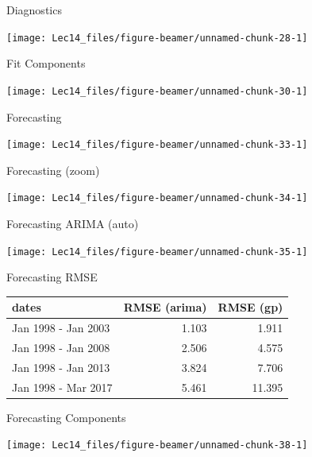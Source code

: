 \documentclass[11pt,ignorenonframetext,]{beamer}
\begin{document}
\begin{frame}{Diagnostics}
\protect\hypertarget{diagnostics}{}

\begin{center}\texttt{[image: Lec14\_files/figure-beamer/unnamed-chunk-28-1]} \end{center}

\end{frame}

\begin{frame}{Fit Components}
\protect\hypertarget{fit-components}{}

\begin{center}\texttt{[image: Lec14\_files/figure-beamer/unnamed-chunk-30-1]} \end{center}

\end{frame}

\begin{frame}{Forecasting}
\protect\hypertarget{forecasting}{}

\begin{center}\texttt{[image: Lec14\_files/figure-beamer/unnamed-chunk-33-1]} \end{center}

\end{frame}

\begin{frame}{Forecasting (zoom)}
\protect\hypertarget{forecasting-zoom}{}

\begin{center}\texttt{[image: Lec14\_files/figure-beamer/unnamed-chunk-34-1]} \end{center}

\end{frame}

\begin{frame}{Forecasting ARIMA (auto)}
\protect\hypertarget{forecasting-arima-auto}{}

\begin{center}\texttt{[image: Lec14\_files/figure-beamer/unnamed-chunk-35-1]} \end{center}

\end{frame}

\begin{frame}{Forecasting RMSE}
\protect\hypertarget{forecasting-rmse}{}

\begin{longtable}[]{@{}lrr@{}}
\toprule
dates & RMSE (arima) & RMSE (gp)\tabularnewline
\midrule
\endhead
Jan 1998 - Jan 2003 & 1.103 & 1.911\tabularnewline
Jan 1998 - Jan 2008 & 2.506 & 4.575\tabularnewline
Jan 1998 - Jan 2013 & 3.824 & 7.706\tabularnewline
Jan 1998 - Mar 2017 & 5.461 & 11.395\tabularnewline
\bottomrule
\end{longtable}

\end{frame}

\begin{frame}{Forecasting Components}
\protect\hypertarget{forecasting-components}{}

\begin{center}\texttt{[image: Lec14\_files/figure-beamer/unnamed-chunk-38-1]} \end{center}

\end{frame}
\end{document}
